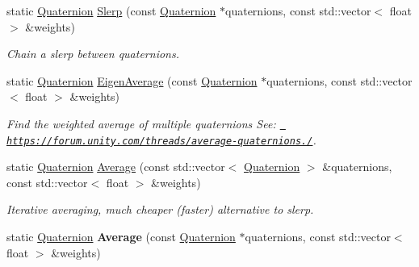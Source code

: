 \begin{DoxyCompactItemize}
\mbox{\label{classrev_1_1_quaternion_afec26e05d0a96fb07c4508071e0a6532}} 
static \mbox{\hyperlink{classrev_1_1_quaternion}{Quaternion}} \mbox{\hyperlink{classrev_1_1_quaternion_afec26e05d0a96fb07c4508071e0a6532}{Slerp}} (const \mbox{\hyperlink{classrev_1_1_quaternion}{Quaternion}} $\ast$quaternions, const std\+::vector$<$ float $>$ \&weights)
\begin{DoxyCompactList}\small\item\em Chain a slerp between quaternions. \end{DoxyCompactList}\item 
\mbox{\label{classrev_1_1_quaternion_a0b7b19a9af744c48d52b39589ac9998b}} 
static \mbox{\hyperlink{classrev_1_1_quaternion}{Quaternion}} \mbox{\hyperlink{classrev_1_1_quaternion_a0b7b19a9af744c48d52b39589ac9998b}{Eigen\+Average}} (const \mbox{\hyperlink{classrev_1_1_quaternion}{Quaternion}} $\ast$quaternions, const std\+::vector$<$ float $>$ \&weights)
\begin{DoxyCompactList}\small\item\em Find the weighted average of multiple quaternions See\+: \href{https://forum.unity.com/threads/average-quaternions.86898/}{\texttt{ https\+://forum.\+unity.\+com/threads/average-\/quaternions./}}. \end{DoxyCompactList}\item 
\mbox{\label{classrev_1_1_quaternion_a15929d78006fec1c8193dc4e8877843d}} 
static \mbox{\hyperlink{classrev_1_1_quaternion}{Quaternion}} \mbox{\hyperlink{classrev_1_1_quaternion_a15929d78006fec1c8193dc4e8877843d}{Average}} (const std\+::vector$<$ \mbox{\hyperlink{classrev_1_1_quaternion}{Quaternion}} $>$ \&quaternions, const std\+::vector$<$ float $>$ \&weights)
\begin{DoxyCompactList}\small\item\em Iterative averaging, much cheaper (faster) alternative to slerp. \end{DoxyCompactList}\item 
\mbox{\label{classrev_1_1_quaternion_aaf87a771e2860550ab5d7a665faf16ef}} 
static \mbox{\hyperlink{classrev_1_1_quaternion}{Quaternion}} {\bfseries Average} (const \mbox{\hyperlink{classrev_1_1_quaternion}{Quaternion}} $\ast$quaternions, const std\+::vector$<$ float $>$ \&weights)

\end{DoxyCompactItemize}

